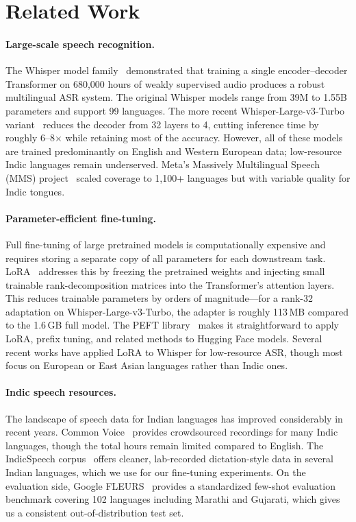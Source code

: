 
\section{Related Work}
\label{sec:related}

\paragraph{Large-scale speech recognition.}
The Whisper model family~\cite{radford2023whisper} demonstrated that training a single encoder--decoder Transformer on 680,000 hours of weakly supervised audio produces a robust multilingual ASR system. The original Whisper models range from 39M to 1.55B parameters and support 99 languages. The more recent Whisper-Large-v3-Turbo variant~\cite{openai_whisper_turbo} reduces the decoder from 32 layers to 4, cutting inference time by roughly 6--8$\times$ while retaining most of the accuracy. However, all of these models are trained predominantly on English and Western European data; low-resource Indic languages remain underserved. Meta's Massively Multilingual Speech (MMS) project~\cite{pratap2023mms} scaled coverage to 1,100+ languages but with variable quality for Indic tongues.

\paragraph{Parameter-efficient fine-tuning.}
Full fine-tuning of large pretrained models is computationally expensive and requires storing a separate copy of all parameters for each downstream task. LoRA~\cite{hu2022lora} addresses this by freezing the pretrained weights and injecting small trainable rank-decomposition matrices into the Transformer's attention layers. This reduces trainable parameters by orders of magnitude---for a rank-32 adaptation on Whisper-Large-v3-Turbo, the adapter is roughly 113\,MB compared to the 1.6\,GB full model. The PEFT library~\cite{peft2023} makes it straightforward to apply LoRA, prefix tuning, and related methods to Hugging Face models. Several recent works have applied LoRA to Whisper for low-resource ASR, though most focus on European or East Asian languages rather than Indic ones.

\paragraph{Indic speech resources.}
The landscape of speech data for Indian languages has improved considerably in recent years. Common Voice~\cite{commonvoice2020} provides crowdsourced recordings for many Indic languages, though the total hours remain limited compared to English. The IndicSpeech corpus~\cite{indicspeech2022} offers cleaner, lab-recorded dictation-style data in several Indian languages, which we use for our fine-tuning experiments. On the evaluation side, Google FLEURS~\cite{conneau2023fleurs} provides a standardized few-shot evaluation benchmark covering 102 languages including Marathi and Gujarati, which gives us a consistent out-of-distribution test set.

